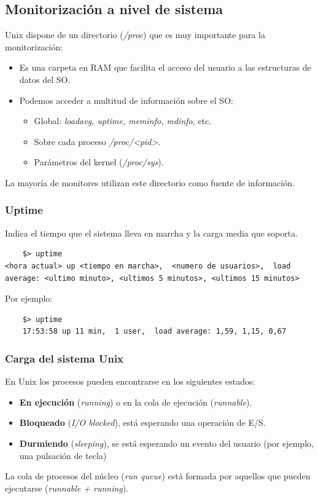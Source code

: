 \documentclass[12pt,spanish]{article}
\begin{document}
\subsection{Monitorización a nivel de sistema}

Unix dispone de un directorio (\textit{/proc}) que es muy importante para la monitorización:
\begin{itemize}
	\item Es una carpeta en RAM que facilita el acceso del usuario a las estructuras de datos del SO.
	\item Podemos acceder a multitud de información sobre el SO:
	\begin{itemize}
		\item Global: \textit{loadavg, uptime, meminfo, mdinfo}, etc.
		\item Sobre cada proceso \textit{/proc/<pid>}.
		\item Parámetros del kernel (\textit{/proc/sys}).
	\end{itemize}
\end{itemize}
La mayoría de monitores utilizan este directorio como fuente de información.

\subsubsection{Uptime}
Indica el tiempo que el sistema lleva en marcha y la carga media que soporta.
\begin{lstlisting}
	$> uptime
<hora actual> up <tiempo en marcha>,  <numero de usuarios>,  load average: <ultimo minuto>, <ultimos 5 minutos>, <ultimos 15 minutos>
\end{lstlisting}
Por ejemplo:
\begin{lstlisting}
	$> uptime
	17:53:58 up 11 min,  1 user,  load average: 1,59, 1,15, 0,67
\end{lstlisting}

\subsubsection{Carga del sistema Unix}

En Unix los procesos pueden encontrarse en los siguientes estados:
\begin{itemize}
	\item \textbf{En ejecución} (\textit{running}) o en la cola de ejecución (\textit{runnable}).
	\item \textbf{Bloqueado} (\textit{I/O blocked}), está esperando una operación de E/S.
	\item \textbf{Durmiendo} (\textit{sleeping}), se está esperando un evento del usuario (por ejemplo, una pulsación de tecla)
\end{itemize}
La cola de procesos del núcleo (\textit{run queue}) está formada por aquellos que pueden ejecutarse (\textit{runnable + running}).\\
\end{document}
